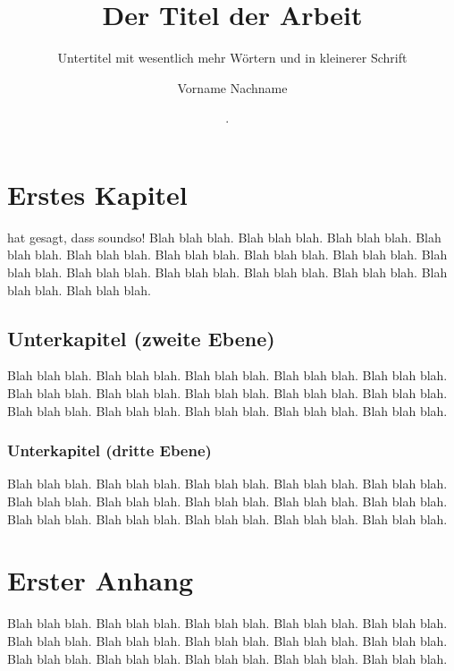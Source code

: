 \documentclass[12pt,a4paper,parskip=half]{scrartcl}
\begin{document}
  \title{Der Titel der Arbeit}
  \subtitle{Untertitel mit wesentlich mehr Wörtern und in kleinerer Schrift}
  \author{Vorname Nachname}
  \date{\the\day. \monthnamengerman\ \the\year}
  \makeheader


\section{Erstes Kapitel}

\cite{L¹} hat gesagt, dass soundso! Blah blah blah. Blah blah blah. Blah blah blah. Blah blah blah. Blah blah blah. Blah blah blah. Blah blah blah. Blah blah blah. Blah blah blah. Blah blah blah. Blah blah blah. Blah blah blah. Blah blah blah. Blah blah blah. Blah blah blah. 

\subsection{Unterkapitel (zweite Ebene)}

Blah blah blah. Blah blah blah. Blah blah blah. Blah blah blah. Blah blah blah. Blah blah blah. Blah blah blah. Blah blah blah. Blah blah blah. Blah blah blah. Blah blah blah. Blah blah blah. Blah blah blah. Blah blah blah. Blah blah blah. 

\subsubsection{Unterkapitel (dritte Ebene)}

Blah blah blah. Blah blah blah. Blah blah blah. Blah blah blah. Blah blah blah. Blah blah blah. Blah blah blah. Blah blah blah. Blah blah blah. Blah blah blah. Blah blah blah. Blah blah blah. Blah blah blah. Blah blah blah. Blah blah blah. 

\makeworkscited

\appendix

\section{Erster Anhang}

Blah blah blah. Blah blah blah. Blah blah blah. Blah blah blah. Blah blah blah. Blah blah blah. Blah blah blah. Blah blah blah. Blah blah blah. Blah blah blah. Blah blah blah. Blah blah blah. Blah blah blah. Blah blah blah. Blah blah blah. 
\end{document}
